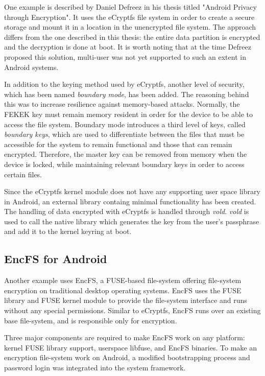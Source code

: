 One example is described by Daniel Defreez in his thesis titled "Android Privacy through Encryption"\cite{defreez}.
It uses the eCryptfs file system in order to create a secure storage and mount it in a location in the unencrypted file system. The approach differs from the one described in this thesis: the entire data partition is encrypted and the decryption is done at boot. It is worth noting that at the time Defreez proposed this solution, multi-user was not yet supported to such an extent in Android systems.

In addition to the keying method used by eCryptfs, another level of security, which has been named \textit{boundary mode}, has been added. The reasoning behind this was to increase resilience against memory-based attacks. Normally, the FEKEK key must remain memory resident in order for the device to be able to access the file system. Boundary mode introduces a third level of keys, called \textit{boundary keys}, which are used to differentiate between the files that must be accessible for the system to remain functional and those that can remain encrypted. Therefore, the master key can be removed from memory when the device is locked, while maintaining relevant boundary keys in order to access certain files.

Since the eCryptfs kernel module does not have any supporting user space library in Android, an external library containg minimal functionality has been created. The handling of data encrypted with eCryptfs is handled through \textit{vold}. \textit{vold} is used to call the native library which generates the key from the user's passphrase and add it to the kernel keyring at boot.

\subsection{EncFS for Android}
\label{sub-sec:encfs-and}

Another example\cite{encfs} uses EncFS, a FUSE-based file-system offering file-system encryption on traditional desktop operating systems. EncFS uses the FUSE library and FUSE kernel module to provide the file-system interface and runs without any special permissions. Similar to eCryptfs, EncFS runs over an existing base file-system, and is responsible only for encryption.

Three major components are required to make EncFS work on any platform: kernel FUSE library support, userspace libfuse, and EncFS binaries. To make an encryption file-system work on Android, a modified bootstrapping process and password login was integrated into the system framework.

